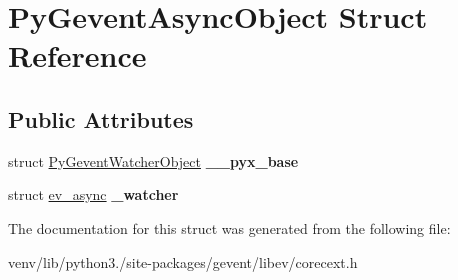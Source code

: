 \hypertarget{struct_py_gevent_async_object}{}\section{Py\+Gevent\+Async\+Object Struct Reference}
\label{struct_py_gevent_async_object}
\subsection*{Public Attributes}
\begin{DoxyCompactItemize}
\item 
\mbox{\label{struct_py_gevent_async_object_aca0f26db8c41efdb65f763082d78be79}} 
struct \hyperlink{struct_py_gevent_watcher_object}{Py\+Gevent\+Watcher\+Object} {\bfseries \+\_\+\+\_\+pyx\+\_\+base}
\item 
\mbox{\label{struct_py_gevent_async_object_ace3d6c768e543ccc20c766ad8b3e29d8}} 
struct \hyperlink{structev__async}{ev\+\_\+async} {\bfseries \+\_\+watcher}
\end{DoxyCompactItemize}


The documentation for this struct was generated from the following file\+:\begin{DoxyCompactItemize}
\item 
venv/lib/python3./site-\/packages/gevent/libev/corecext.\+h\end{DoxyCompactItemize}
